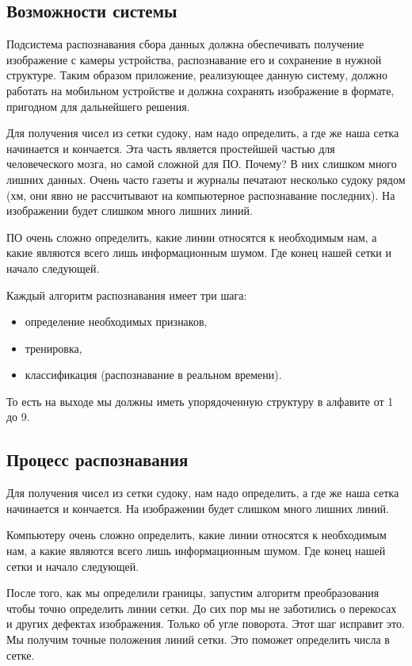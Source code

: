 \subsection{Возможности системы}

Подсистема распознавания сбора данных должна обеспечивать получение изображение с камеры устройства, распознавание его и сохранение в нужной структуре.  Таким образом приложение, реализующее данную систему, должно работать на мобильном устройстве и должна сохранять изображение в формате, пригодном для дальнейшего решения. 

Для получения чисел из сетки судоку, нам надо определить, а где же наша сетка начинается и кончается. Эта часть является простейшей частью для человеческого мозга, но самой сложной для ПО. Почему? В них слишком много лишних данных. Очень часто газеты и журналы печатают несколько судоку рядом (хм, они явно не рассчитывают на компьютерное распознавание последних). На изображении будет слишком много лишних линий. 

ПО очень сложно определить, какие линии относятся к необходимым нам, а какие являются всего лишь информационным шумом. Где конец нашей сетки и начало следующей.

Каждый алгоритм распознавания имеет три шага:
\begin{itemize}
\item определение необходимых признаков,
\item тренировка,
\item классификация (распознавание в реальном времени).
\end{itemize}

То есть на выходе мы должны иметь упорядоченную структуру в алфавите от 1 до 9.

\subsection{Процесс распознавания}

Для получения чисел из сетки судоку, нам надо определить, а где же наша сетка начинается и кончается.  На изображении будет слишком много лишних линий. 

Компьютеру очень сложно определить, какие линии относятся к необходимым нам, а какие являются всего лишь информационным шумом. Где конец нашей сетки и начало следующей.

После того, как мы определили границы, запустим алгоритм преобразования чтобы точно определить линии сетки. До сих пор мы не заботились о перекосах и других дефектах изображения. Только об угле поворота. Этот шаг исправит это. Мы получим точные положения линий сетки. Это поможет определить числа в сетке.

